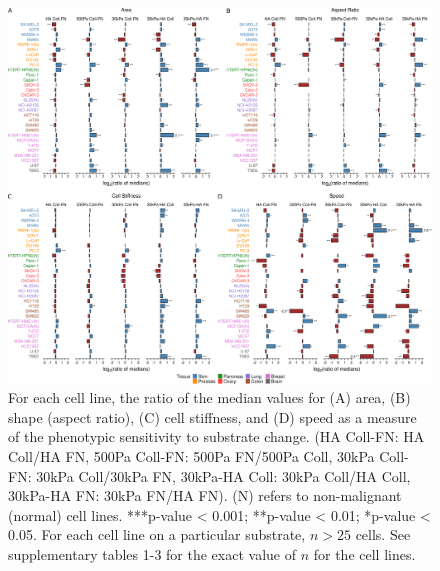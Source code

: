 \documentclass[11pt,letterpaper,english,oneside]{article} %
\begin{document}
\begin{figure}[H]
    \hspace*{-2cm}
    \centering
    \includegraphics[scale=0.13]{../Figures/Supplementary_Figure2/supplementary_figure2.png}
    \caption{For each cell line, the ratio of the median values for (A) area, (B) shape (aspect ratio), (C) cell stiffness, and (D) speed as a measure of the phenotypic sensitivity to substrate change. 
    (HA Coll-FN: HA Coll/HA FN, 500Pa Coll-FN: 500Pa FN/500Pa Coll, 30kPa Coll-FN: 30kPa Coll/30kPa FN, 30kPa-HA Coll: 30kPa Coll/HA Coll, 30kPa-HA FN: 30kPa FN/HA FN). (N) refers to non-malignant (normal) cell lines. 
    ***p-value < 0.001; **p-value < 0.01; *p-value < 0.05. For each cell line on a particular substrate, $n > 25$ cells. See supplementary tables 1-3 for the exact value of $n$ for the cell lines.}
    \label{fig:fig2}
\end{figure}
\end{document}
